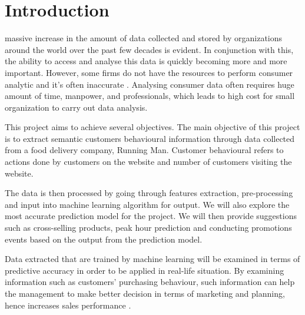 \documentclass[journal]{IEEEtran}
\begin{document}
	
	
	\section{Introduction}
	 massive increase in the amount of data collected and stored by organizations around the world over the past few decades is evident. In conjunction with this, the ability to access and analyse this data is quickly becoming more and more important. However, some firms do not have the resources to perform consumer analytic and it’s often inaccurate \cite{Erevelles2016-oa}. Analysing consumer data often requires huge amount of time, manpower, and professionals, which leads to high cost for small organization to carry out data analysis.
	
	This project aims to achieve several objectives. The main objective of this project is to extract semantic customers behavioural information through data collected from a food delivery company, Running Man. Customer behavioural refers to actions done by customers on the website and number of customers visiting the website. 
	
	The data is then processed by going through features extraction, pre-processing and input into machine learning algorithm for output. We will also explore the most accurate prediction model for the project. We will then provide suggestions such as cross-selling products, peak hour prediction and conducting promotions events based on the output from the prediction model.
	
	Data extracted that are trained by machine learning will be examined in terms of predictive accuracy in order to be applied in real-life situation. By examining information such as customers’ purchasing behaviour, such information can help the management to make better decision in terms of marketing and planning, hence increases sales performance \cite{Raorane2011-xu}.
\end{document}
